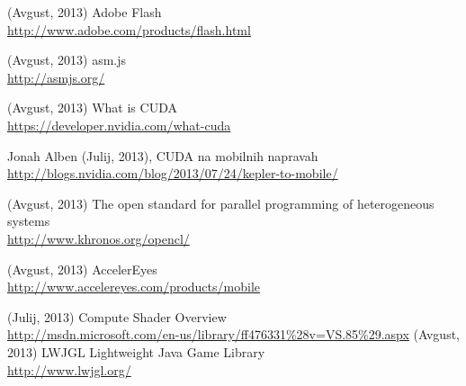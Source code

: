 \begin{thebibliography}{1}
 (Avgust, 2013) Adobe Flash
\\ \url{http://www.adobe.com/products/flash.html}

 (Avgust, 2013) asm.js
\\ \url{http://asmjs.org/}

 (Avgust, 2013) What is CUDA
\\ \url{https://developer.nvidia.com/what-cuda}

  Jonah Alben (Julij, 2013), CUDA na mobilnih napravah
\\ \url{http://blogs.nvidia.com/blog/2013/07/24/kepler-to-mobile/}

 (Avgust, 2013) The open standard for parallel programming of heterogeneous systems
\\ \url{http://www.khronos.org/opencl/}

 (Avgust, 2013) AccelerEyes
\\ \url{http://www.accelereyes.com/products/mobile}

 (Julij, 2013) Compute Shader Overview
\\ \url{http://msdn.microsoft.com/en-us/library/ff476331\%28v=VS.85\%29.aspx}
 (Avgust, 2013) LWJGL Lightweight Java Game Library
\\ \url{http://www.lwjgl.org/}

\end{thebibliography}


